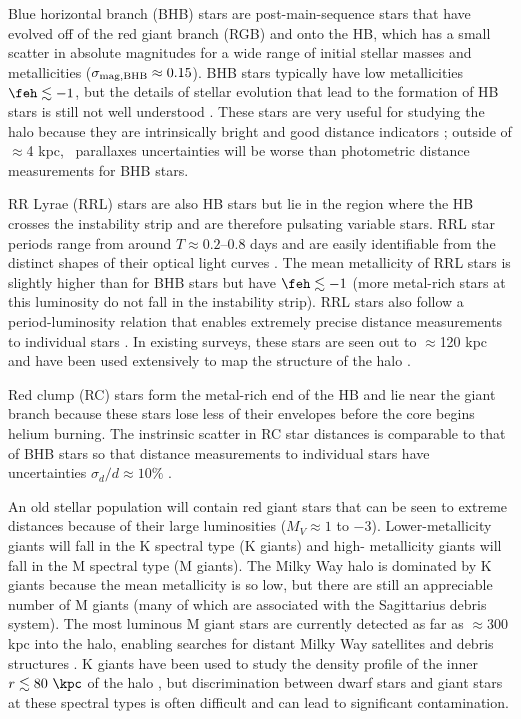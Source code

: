 Blue horizontal branch (BHB) stars are post-main-sequence stars that have
evolved off of the red giant branch (RGB) and onto the HB, which
has a small scatter in absolute magnitudes for a wide range of initial stellar
masses and metallicities ($\sigma_{\rm mag,BHB} \approx 0.15$). BHB stars
typically have low metallicities $\feh \lesssim -1$, but the details of stellar
evolution that lead to the formation of HB stars is still not well understood
\citep{percival11}. These stars are very useful for studying the halo because
they are intrinsically bright and good distance indicators \cite[$\sigma_{d}/d
\approx 10\%$; see, e.g.,][]{xue08, deason11}; outside of $\approx$4 kpc, \gaia\
parallaxes uncertainties will be worse than photometric distance measurements
for BHB stars.

RR Lyrae (RRL) stars are also HB stars but lie in the region where the HB
crosses the instability strip and are therefore pulsating variable stars. RRL
star periods range from around $T \approx 0.2$--$0.8$ days and are easily
identifiable from the distinct shapes of their optical light curves
\citep[e.g.,][]{sesar10}. The mean metallicity of RRL stars is slightly higher
than for BHB stars but have $\feh \lesssim -1$ (more metal-rich stars at this
luminosity do not fall in the instability strip). RRL stars also follow a
period-luminosity relation \citep[tightest in the mid-infrared;][]{madore12}
that enables extremely precise distance measurements to individual stars
\citep[$\approx$1--2\%;][]{klein14}. In existing surveys, these stars are seen
out to $\approx$120 kpc \citep{sesar10} and have been used extensively to map
the structure of the halo \citep[e.g.,][]{sesar13a}.

Red clump (RC) stars form the metal-rich end of the HB and lie near the giant
branch because these stars lose less of their envelopes before the core begins
helium burning. The instrinsic scatter in RC star distances is comparable to
that of BHB stars so that distance measurements to individual stars have
uncertainties $\sigma_{d}/d \approx 10\%$ \citep[e.g.,][]{bovy14-rc}.

An old stellar population will contain red giant stars that can be seen to
extreme distances because of their large luminosities ($M_V \approx 1$ to $-3$).
Lower-metallicity giants will fall in the K spectral type (K giants) and high-
metallicity giants will fall in the M spectral type (M giants). The Milky Way
halo is dominated by K giants because the mean metallicity is so low, but there
are still an appreciable number of M giants (many of which are associated with
the Sagittarius debris system). The most luminous M giant stars are currently
detected as far as $\approx$300 kpc into the halo, enabling searches for distant
Milky Way satellites and debris structures \citep{bochanski14}. K giants have
been used to study the density profile of the inner $r \lesssim 80~\kpc$ of the
halo \citep{xue15}, but discrimination between dwarf stars and giant stars at
these spectral types is often difficult and can lead to significant
contamination.

